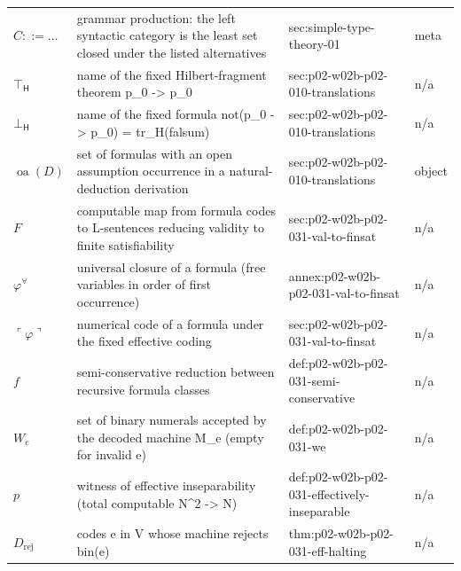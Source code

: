 \begin{longtable}{@{}p{}p{}p{}p{}@{}}
\(C::=\ldots\) & grammar production: the left syntactic category is the least set closed under the listed alternatives & sec:\allowbreak{}simple-\allowbreak{}type-\allowbreak{}theory-\allowbreak{}01 & meta \\
\(\top_{\mathsf H}\) & name of the fixed Hilbert-fragment theorem p\_0 -> p\_0 & sec:\allowbreak{}p02-\allowbreak{}w02b-\allowbreak{}p02-\allowbreak{}010-\allowbreak{}translations & n/a \\
\(\bot_{\mathsf H}\) & name of the fixed formula not(p\_0 -> p\_0) = tr\_H(falsum) & sec:\allowbreak{}p02-\allowbreak{}w02b-\allowbreak{}p02-\allowbreak{}010-\allowbreak{}translations & n/a \\
\(\operatorname{oa}(D)\) & set of formulas with an open assumption occurrence in a natural-deduction derivation & sec:\allowbreak{}p02-\allowbreak{}w02b-\allowbreak{}p02-\allowbreak{}010-\allowbreak{}translations & object \\
\(F\) & computable map from formula codes to L-sentences reducing validity to finite satisfiability & sec:\allowbreak{}p02-\allowbreak{}w02b-\allowbreak{}p02-\allowbreak{}031-\allowbreak{}val-\allowbreak{}to-\allowbreak{}finsat & n/a \\
\(\varphi^{\forall}\) & universal closure of a formula (free variables in order of first occurrence) & annex:\allowbreak{}p02-\allowbreak{}w02b-\allowbreak{}p02-\allowbreak{}031-\allowbreak{}val-\allowbreak{}to-\allowbreak{}finsat & n/a \\
\(\ulcorner\varphi\urcorner\) & numerical code of a formula under the fixed effective coding & sec:\allowbreak{}p02-\allowbreak{}w02b-\allowbreak{}p02-\allowbreak{}031-\allowbreak{}val-\allowbreak{}to-\allowbreak{}finsat & n/a \\
\(f\) & semi-conservative reduction between recursive formula classes & def:\allowbreak{}p02-\allowbreak{}w02b-\allowbreak{}p02-\allowbreak{}031-\allowbreak{}semi-\allowbreak{}conservative & n/a \\
\(W_e\) & set of binary numerals accepted by the decoded machine M\_e (empty for invalid e) & def:\allowbreak{}p02-\allowbreak{}w02b-\allowbreak{}p02-\allowbreak{}031-\allowbreak{}we & n/a \\
\(p\) & witness of effective inseparability (total computable N\^{}2 -> N) & def:\allowbreak{}p02-\allowbreak{}w02b-\allowbreak{}p02-\allowbreak{}031-\allowbreak{}effectively-\allowbreak{}inseparable & n/a \\
\(D_{\mathrm{rej}}\) & codes e in V whose machine rejects bin(e) & thm:\allowbreak{}p02-\allowbreak{}w02b-\allowbreak{}p02-\allowbreak{}031-\allowbreak{}eff-\allowbreak{}halting & n/a \\

\end{longtable}
